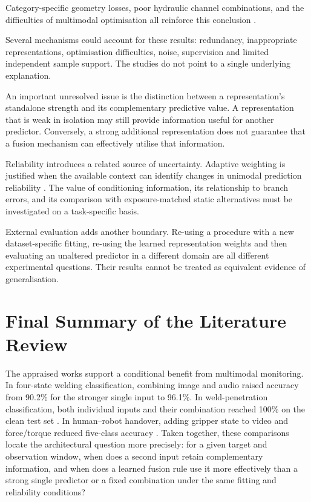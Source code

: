 Category-specific geometry losses, poor hydraulic channel combinations, and the difficulties of
multimodal optimisation all reinforce this conclusion
\parencite{Horwitz2023Back,Bonfiglioli2023The,Goodarzi2023Deep,Wang2020What}.

Several mechanisms could account for these results: redundancy, inappropriate representations,
optimisation difficulties, noise, supervision and limited independent sample support. The studies do
not point to a single underlying explanation.

An important unresolved issue is the distinction between a representation's standalone strength and
its complementary predictive value. A representation that is weak in isolation may still provide
information useful for another predictor. Conversely, a strong additional representation does not
guarantee that a fusion mechanism can effectively utilise that information.

Reliability introduces a related source of uncertainty. Adaptive weighting is justified when the
available context can identify changes in unimodal prediction reliability \parencite{Zhang2023QMF,P022}.
The value of conditioning information, its relationship to branch errors, and its comparison with
exposure-matched static alternatives must be investigated on a task-specific basis.

External evaluation adds another boundary. Re-using a procedure with a new dataset-specific fitting,
re-using the learned representation weights and then evaluating an unaltered predictor in a
different domain are all different experimental questions. Their results cannot be treated as equivalent evidence of generalisation.

\section{Final Summary of the Literature Review}

The \ReviewWorkCount{} appraised works support a conditional benefit from multimodal monitoring. In four-state welding classification, combining image and audio raised accuracy from 90.2\% for the stronger single input to 96.1\%. In weld-penetration classification, both individual inputs and their combination reached 100\% on the clean test set \parencite{P003,Hua2026Weld}. In human--robot handover, adding gripper state to video and force/torque reduced five-class accuracy \parencite{Thoduka2024Handover}. Taken together, these comparisons locate the architectural question more precisely: for a given target and observation window, when does a second input retain complementary information, and when does a learned fusion rule use it more effectively than a strong single predictor or a fixed combination under the same fitting and reliability conditions?

\ReviewFollowupTable
